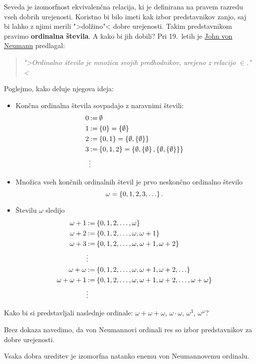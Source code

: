 Seveda je izomorfnost ekvivalenčna relacija, ki je definirana na pravem razredu vseh dobrih urejenosti. 
Koristno bi bilo imeti kak izbor predstavnikov zanjo, saj bi lahko z njimi merili ">dolžino"< dobre urejenosti. Takim predstavnikom pravimo \textbf{ordinalna števila}. A kako bi jih dobili? Pri 19.~letih je \href{https://en.wikipedia.org/wiki/John_von_Neumann}{John von Neumann} predlagal:
%
\begin{quote}
  \emph{">Ordinalno število je množica svojih predhodnikov, urejeno z relacijo $\in$."<}
\end{quote}
%
Poglejmo, kako deluje njegova ideja:
%
\begin{itemize}

\item Končna ordinalna števila sovpadajo z naravnimi števili:
  \begin{align*}
    0 &\mathbin{{:}{=}} \emptyset \\
    1 &\mathbin{{:}{=}} \left\{0\right\} = \left\{\emptyset\right\} \\
    2 &\mathbin{{:}{=}} \left\{0, 1\right\} = \left\{\emptyset, \left\{\emptyset\right\}\right\} \\
    3 &\mathbin{{:}{=}} \left\{0, 1, 2\right\} = \left\{\emptyset, \left\{\emptyset\right\}, \left\{\emptyset, \left\{\emptyset\right\}\right\}\right\} \\
      &\vdots
  \end{align*}

\item Množica vseh končnih ordinalnih števil je prvo neskončno ordinalno število
  \begin{equation*}
    \omega = \left\{0, 1, 2, 3, \ldots\right\}.
  \end{equation*}

\item Številu $\omega$ sledijo
  \begin{align*}
    \omega + 1 &\mathbin{{:}{=}} \left\{0, 1, 2, \ldots, \omega\right\} \\
    \omega + 2 &\mathbin{{:}{=}} \left\{0, 1, 2, \ldots, \omega, \omega + 1\right\} \\
    \omega + 3 &\mathbin{{:}{=}} \left\{0, 1, 2, \ldots, \omega, \omega + 1, \omega + 2\right\} \\
               &\vdots \\
    \omega + \omega &\mathbin{{:}{=}} \left\{0, 1, 2, \ldots, \omega, \omega + 1, \omega + 2, \ldots\right\} \\
    \omega + \omega + 1 &\mathbin{{:}{=}} \left\{0, 1, 2, \ldots, \omega, \omega + 1, \omega + 2, \ldots, \omega + \omega\right\} \\
               &\vdots
  \end{align*}
\end{itemize}

\begin{naloga}
  Kako bi si predstavljali naslednje ordinale: $\omega + \omega + \omega$, $\omega \cdot \omega$, $\omega^3$, $\omega^\omega$?
\end{naloga}


Brez dokaza navedimo, da von Neumannovi ordinali res so izbor predstavnikov za dobre urejenosti.

\begin{izrek}
  Vsaka dobra ureditev je izomorfna natanko enemu von Neumannovemu ordinalu.
\end{izrek}